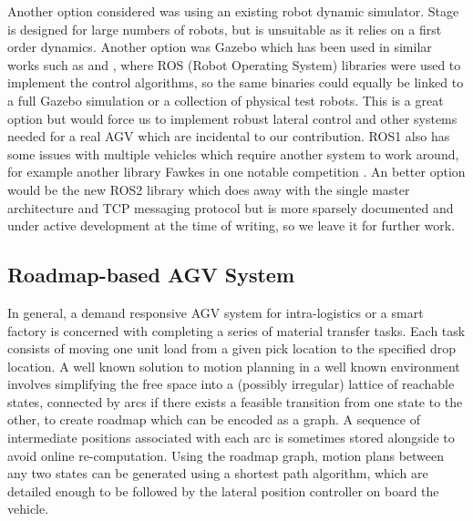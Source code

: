 Another option considered was using an existing robot dynamic simulator. Stage \cite{Vaughan2008} is designed for large numbers of robots, but is unsuitable as it relies on a first order dynamics. Another option was Gazebo \cite{Rivera2019} which has been used in similar works such as \cite{Walenta2017} and \cite{Yan2017}, where ROS (Robot Operating System) libraries were used to implement the control algorithms, so the same binaries could equally be linked to a full Gazebo simulation or a collection of physical test robots. This is a great option but would force us to implement robust lateral control and other systems needed for a real AGV which are incidental to our contribution. %
ROS1 also has some issues with multiple vehicles which require another system to work around, for example another library Fawkes in one notable competition \cite{Niemueller2017}. An better option would be the new ROS2 library which does away with the single master architecture and TCP messaging protocol \cite{Eros2019} but is more sparsely documented and under active development at the time of writing, so we leave it for further work. 


\subsection{Roadmap-based AGV System}
In general, a demand responsive AGV system for intra-logistics or a smart factory is concerned with completing a series of material transfer tasks. Each task consists of moving one unit load from a given pick location to the specified drop location. A well known solution to motion planning in a well known environment involves simplifying the free space into a (possibly irregular) lattice of reachable states, connected by arcs if there exists a feasible transition from one state to the other, to create  roadmap which can be encoded as a graph. A sequence of intermediate positions associated with each arc is sometimes stored alongside to avoid online re-computation. Using the roadmap graph, motion plans between any two states can be generated using a shortest path algorithm, which are detailed enough to be followed by the lateral position controller on board the vehicle. 

